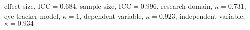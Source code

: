 effect size, $\textrm{ICC} = 0.684$, sample size, $\textrm{ICC} = 0.996$, research domain, $\kappa = 0.731$, eye-tracker model, $\kappa = 1$, dependent variable, $\kappa = 0.923$, independent variable, $\kappa = 0.934$
